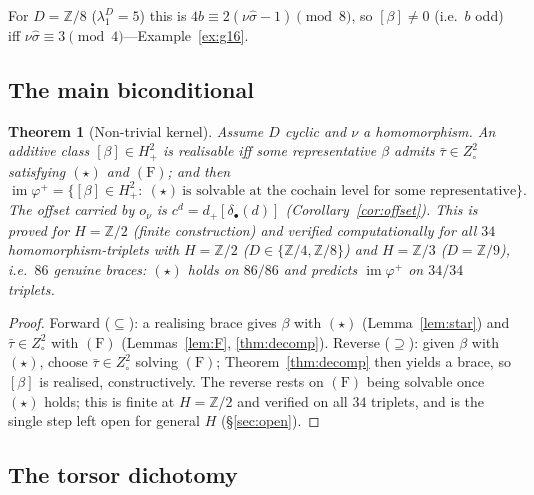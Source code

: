 \documentclass[11pt,reqno]{amsart}
\theoremstyle{plain}
\newtheorem{theorem}{Theorem}[section]
\theoremstyle{definition}
\newcommand{\Z}{\mathbb{Z}}
\newcommand{\im}{\operatorname{im}}
\newcommand{\shat}{\widehat{\sigma}}
\newcommand{\lD}{\lambda^{D}}
\begin{document}
For $D=\Z/8$ ($\lD_1=5$) this is $4b\equiv2(\nu\shat-1)\pmod8$, so $[\beta]\ne0$ (i.e.\ $b$
odd) iff $\nu\shat\equiv3\pmod4$---Example~\ref{ex:g16}.

\subsection{The main biconditional}

\begin{theorem}[Non-trivial kernel]\label{thm:main-nt}
Assume $D$ cyclic and $\nu$ a homomorphism. An additive class $[\beta]\in H^2_+$ is
realisable iff some representative $\beta$ admits $\bar\tau\in Z^2_\circ$ satisfying
$(\star)$ and $\mathrm{(F)}$; and then
\[
\im\varphi^{+}=\big\{[\beta]\in H^2_+:\ (\star)\ \text{is solvable at the cochain level for
some representative}\big\}.
\]
The offset carried by $o_\nu$ is $c^d=d_+[\delta_\bullet(d)]$ (Corollary~\ref{cor:offset}).
This is \emph{proved} for $H=\Z/2$ (finite construction) and verified computationally for
all $34$ homomorphism-triplets with $H=\Z/2$ ($D\in\{\Z/4,\Z/8\}$) and $H=\Z/3$ ($D=\Z/9$),
i.e.\ $86$ genuine braces: $(\star)$ holds on $86/86$ and predicts $\im\varphi^{+}$ on
$34/34$ triplets.
\end{theorem}
\begin{proof}
Forward ($\subseteq$): a realising brace gives $\beta$ with $(\star)$ (Lemma~\ref{lem:star})
and $\bar\tau\in Z^2_\circ$ with $\mathrm{(F)}$ (Lemmas~\ref{lem:F}, \ref{thm:decomp}).
Reverse ($\supseteq$): given $\beta$ with $(\star)$, choose $\bar\tau\in Z^2_\circ$ solving
$\mathrm{(F)}$; Theorem~\ref{thm:decomp} then yields a brace, so $[\beta]$ is realised,
constructively. The reverse rests on $\mathrm{(F)}$ being solvable once $(\star)$ holds; this
is finite at $H=\Z/2$ and verified on all $34$ triplets, and is the single step left open
for general $H$ (\S\ref{sec:open}).
\end{proof}

\subsection{The torsor dichotomy}\label{sec:torsor}
\end{document}
